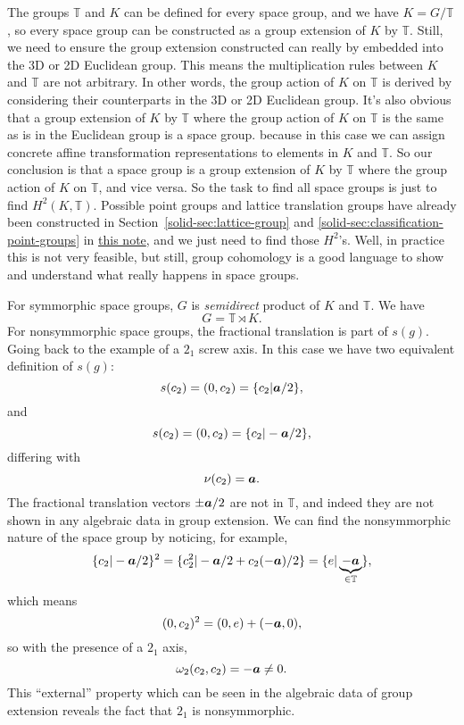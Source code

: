 \documentclass[hyperref, a4paper]{article}
\newcommand{\soliddoc}{\href{../solid/solid.pdf}{this note}}
\begin{document}
The groups $\mathbb{T}$ and $K$ can be defined for every space group, and we have $K = G / \mathbb{T}$, 
so every space group can be constructed as a group extension of $K$ by $\mathbb{T}$. Still, we need to 
ensure the group extension constructed can really by embedded into the 3D or 2D Euclidean group. 
This means the multiplication rules between $K$ and $\mathbb{T}$ are not arbitrary. In other words, 
the group action of $K$ on $\mathbb{T}$ is derived by considering their counterparts in the 3D or 2D 
Euclidean group. It's also obvious that a group extension of $K$ by $\mathbb{T}$ where the group action 
of $K$ on $\mathbb{T}$ is the same as is in the Euclidean group is a space group. because in this case 
we can assign concrete affine transformation representations to elements in $K$ and $\mathbb{T}$. 
So our conclusion is that a space group is a group extension of $K$ by $\mathbb{T}$ where the group action 
of $K$ on $\mathbb{T}$, and vice versa. So the task to find all space groups is just to find $H^2(K, \mathbb{T})$.
Possible point groups and lattice translation groups have already been constructed in 
Section~\ref{solid-sec:lattice-group} and \ref{solid-sec:classification-point-groups} in \soliddoc,
and we just need to find those $H^2$'s. Well, in practice this is not very feasible, but still, group 
cohomology is a good language to show and understand what really happens in space groups.

For symmorphic space groups, $G$ is \emph{semidirect}
product of $K$ and $\mathbb{T}$. We have 
\begin{equation}
    G = \mathbb{T} \rtimes K.
\end{equation}
For nonsymmorphic space groups, the fractional translation is part of $s(g)$. Going back to the 
example of a $2_1$ screw axis. In this case we have two equivalent definition of $s(g)$:
\[
    s(c_2) = (0, c_2) = \{ c_2 | \vb*{a} / 2 \},
\]
and 
\[
    s(c_2) = (0, c_2) = \{ c_2 | - \vb*{a} / 2 \},
\]
differing with
\[
    \nu(c_2) = \vb*{a}.
\]
The fractional translation vectors $\pm \vb*{a} / 2$ are not in $\mathbb{T}$, and indeed they are not 
shown in any algebraic data in group extension. We can find the nonsymmorphic nature of the space group 
by noticing, for example, 
\[
    \{c_2 | - \vb*{a} / 2 \} ^2 = \{ c_2^2 | - \vb*{a} / 2 + c_2 (- \vb*{a}) / 2 \} = \{ e | \underbrace{- \vb*{a}}_{\in \mathbb{T}} \},
\]
which means 
\[
    (0, c_2)^2 = (0, e) + (- \vb*{a}, 0),
\]
so with the presence of a $2_1$ axis, 
\begin{equation}
    \omega_2(c_2, c_2) = - \vb*{a} \neq 0.
\end{equation}
This ``external'' property which can be seen in the algebraic data of group extension reveals the fact 
that $2_1$ is nonsymmorphic. 
\end{document}
